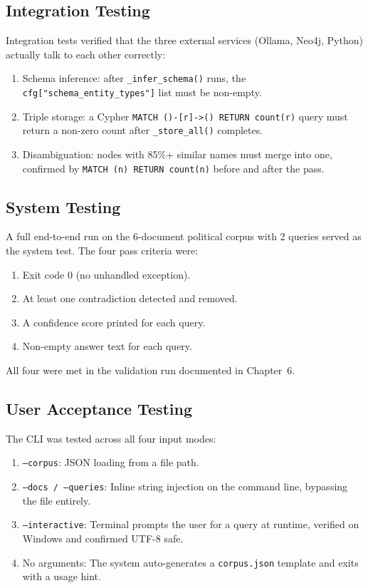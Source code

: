 \subsection{Integration Testing}

Integration tests verified that the three external services (Ollama, Neo4j, Python)
actually talk to each other correctly:

\begin{enumerate}
    \item Schema inference: after \texttt{\_infer\_schema()} runs, the
    \texttt{cfg["schema\_entity\_types"]} list must be non-empty.
    \item Triple storage: a Cypher \texttt{MATCH ()-[r]->() RETURN count(r)}
    query must return a non-zero count after \texttt{\_store\_all()} completes.
    \item Disambiguation: nodes with 85\%+ similar names must merge into one,
    confirmed by \texttt{MATCH (n) RETURN count(n)} before and after the pass.
\end{enumerate}

\subsection{System Testing}

A full end-to-end run on the 6-document political corpus with 2 queries served
as the system test. The four pass criteria were:

\begin{enumerate}
    \item Exit code 0 (no unhandled exception).
    \item At least one contradiction detected and removed.
    \item A confidence score printed for each query.
    \item Non-empty answer text for each query.
\end{enumerate}

All four were met in the validation run documented in Chapter~6.

\subsection{User Acceptance Testing}

The CLI was tested across all four input modes:

\begin{enumerate}
    \item \texttt{--corpus}: JSON loading from a file path.
    \item \texttt{--docs / --queries}: Inline string injection on the
    command line, bypassing the file entirely.
    \item \texttt{--interactive}: Terminal prompts the user for a query at
    runtime, verified on Windows and confirmed UTF-8 safe.
    \item No arguments: The system auto-generates a \texttt{corpus.json}
    template and exits with a usage hint.
\end{enumerate}


